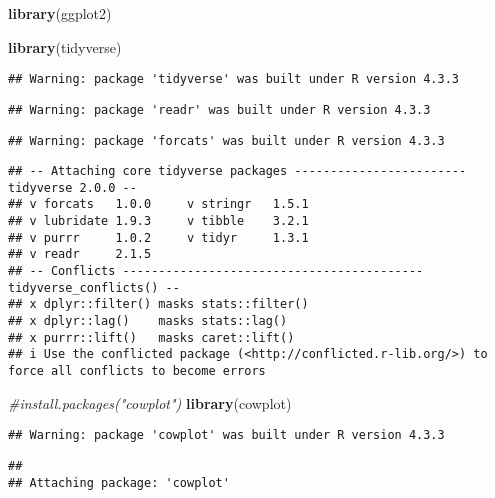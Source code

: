 \documentclass[
]{article}
\newenvironment{Shaded}{\begin{snugshade}}{\end{snugshade}}
\newcommand{\CommentTok}[1]{\textcolor[rgb]{0.56,0.35,0.01}{\textit{#1}}}
\newcommand{\FunctionTok}[1]{\textcolor[rgb]{0.13,0.29,0.53}{\textbf{#1}}}
\newcommand{\NormalTok}[1]{#1}
\begin{document}
\begin{Shaded}
\begin{Highlighting}[]
\FunctionTok{library}\NormalTok{(ggplot2)}
\end{Highlighting}
\end{Shaded}

\begin{Shaded}
\begin{Highlighting}[]
\FunctionTok{library}\NormalTok{(tidyverse)}
\end{Highlighting}
\end{Shaded}

\begin{verbatim}
## Warning: package 'tidyverse' was built under R version 4.3.3
\end{verbatim}

\begin{verbatim}
## Warning: package 'readr' was built under R version 4.3.3
\end{verbatim}

\begin{verbatim}
## Warning: package 'forcats' was built under R version 4.3.3
\end{verbatim}

\begin{verbatim}
## -- Attaching core tidyverse packages ------------------------ tidyverse 2.0.0 --
## v forcats   1.0.0     v stringr   1.5.1
## v lubridate 1.9.3     v tibble    3.2.1
## v purrr     1.0.2     v tidyr     1.3.1
## v readr     2.1.5     
## -- Conflicts ------------------------------------------ tidyverse_conflicts() --
## x dplyr::filter() masks stats::filter()
## x dplyr::lag()    masks stats::lag()
## x purrr::lift()   masks caret::lift()
## i Use the conflicted package (<http://conflicted.r-lib.org/>) to force all conflicts to become errors
\end{verbatim}

\begin{Shaded}
\begin{Highlighting}[]
\CommentTok{\#install.packages("cowplot")}
\FunctionTok{library}\NormalTok{(cowplot)}
\end{Highlighting}
\end{Shaded}

\begin{verbatim}
## Warning: package 'cowplot' was built under R version 4.3.3
\end{verbatim}

\begin{verbatim}
## 
## Attaching package: 'cowplot'
\end{verbatim}
\end{document}
